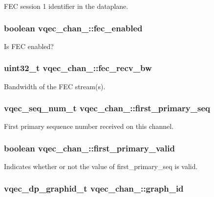 FEC session 1 identifier in the dataplane. 
\subsubsection{\setlength{\rightskip}{0pt plus 5cm}boolean \bf{vqec\_\-chan\_\-::fec\_\-enabled}}\label{structvqec__chan___69b84d70ea52c3e378f5428f1c9ed20c}


Is FEC enabled? 
\subsubsection{\setlength{\rightskip}{0pt plus 5cm}uint32\_\-t \bf{vqec\_\-chan\_\-::fec\_\-recv\_\-bw}}\label{structvqec__chan___5c2066dd83398e4c991fce0d95871286}


Bandwidth of the FEC stream(s). 
\subsubsection{\setlength{\rightskip}{0pt plus 5cm}vqec\_\-seq\_\-num\_\-t \bf{vqec\_\-chan\_\-::first\_\-primary\_\-seq}}\label{structvqec__chan___e2b2359ce6058fdb4461acec6057f13c}


First primary sequence number received on this channel. 
\subsubsection{\setlength{\rightskip}{0pt plus 5cm}boolean \bf{vqec\_\-chan\_\-::first\_\-primary\_\-valid}}\label{structvqec__chan___5eee52eae96ad22aa455283e840d5a4f}


Indicates whether or not the value of first\_\-primary\_\-seq is valid. 
\subsubsection{\setlength{\rightskip}{0pt plus 5cm}vqec\_\-dp\_\-graphid\_\-t \bf{vqec\_\-chan\_\-::graph\_\-id}}\label{structvqec__chan___de566d9f5ec156edc9dfe29fb37cda47}


